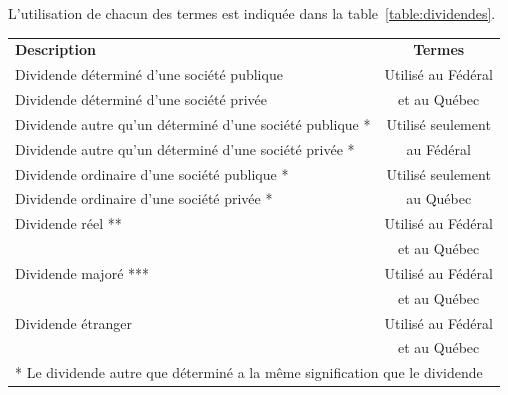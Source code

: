 L'utilisation de chacun des termes est indiquée dans la table~\ref{table:dividendes}.
\begin{table}
	\centering
	\begin{tabular}{|l|c|}
		\hline
		\rowcolor{LightGreen}\multicolumn{2}{|c|}{\textbf{Dividendes}}                                                         \\ \hline
		\textbf{Description}                                      &                      \textbf{Termes}                       \\ \hline
		Dividende déterminé d'une société publique                &                     Utilisé au Fédéral                     \\
		Dividende déterminé d'une société privée                  &                        et au Québec                        \\ \hline
		Dividende autre qu'un déterminé d'une société publique *  &                     Utilisé seulement                      \\
		Dividende autre qu'un déterminé d'une société privée *    &                         au Fédéral                         \\ \hdashline
		Dividende ordinaire d'une société publique *              &                     Utilisé seulement                      \\
		Dividende ordinaire d'une société privée *                &                         au Québec                          \\ \hline
		Dividende réel **                                         &                     Utilisé au Fédéral                     \\
		                                                          &                        et au Québec                        \\ \hline
		Dividende majoré ***                                      &                     Utilisé au Fédéral                     \\
		                                                          &                        et au Québec                        \\ \hline
		Dividende étranger                                        &                     Utilisé au Fédéral                     \\
		                                                          &                        et au Québec                        \\ \hline\hline
		\multicolumn{2}{|l|}{* Le dividende autre que déterminé a la même signification que le dividende}                      \\

\end{tabular}
\end{table}
